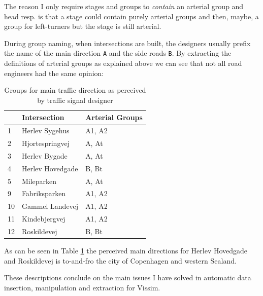The reason I only require stages and groups to \textit{contain} an arterial group and head resp. is that a stage could contain purely arterial groups and then, maybe, a group for left-turners but the stage is still arterial.

During group naming, when intersections are built, the designers usually prefix the name of the main direction \verb|A| and the side roads \verb|B|. By extracting the definitions of arterial groups as explained above we can see that not all road engineers had the same opinion:

\begin{table}[!ht]
\centering
\begin{tabular}{l|l|l}
 & \textbf{Intersection} & \textbf{Arterial Groups}\\ \hline
1 & Herlev Sygehus & A1, A2\\
2 & Hjortespringvej & A, At\\
3 & Herlev Bygade & A, At\\
4 & Herlev Hovedgade & B, Bt\\
5 & Mileparken & A, At\\
9 & Fabriksparken & A1, A2\\
10 & Gammel Landevej & A1, A2\\
11 & Kindebjergvej & A1, A2\\
12 & Roskildevej & B, Bt\\
\end{tabular}
\caption{Groups for main traffic direction as perceived by traffic signal designer}
\label{tab:arterial_groups}
\end{table}

As can be seen in Table \ref{tab:arterial_groups} the perceived main directions for Herlev Hovedgade and Roskildevej is to-and-fro the city of Copenhagen and western Sealand.

These descriptions conclude on the main issues I have solved in automatic data insertion, manipulation and extraction for Vissim.